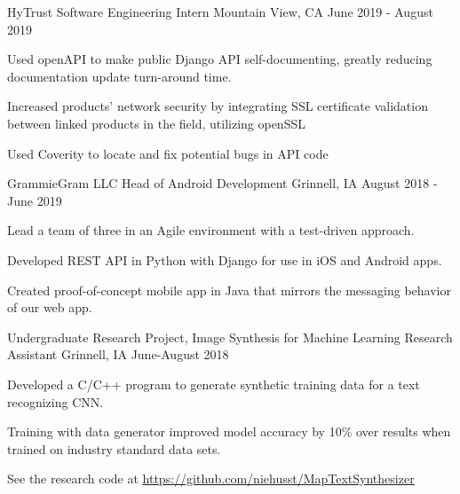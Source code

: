 \documentclass[12pt, a4paper]{awesome-cv}
\begin{document}
\begin{cventries}

  \cventry
    {HyTrust}
    {Software Engineering Intern}
    {Mountain View, CA}
    {June 2019 - August 2019}
    {
      \begin{cvitems}
	\item {Used openAPI to make public Django API self-documenting, greatly reducing documentation update turn-around time.}
	\item {Increased products' network security by integrating SSL certificate validation between linked products in the field, utilizing openSSL}
	\item {Used Coverity to locate and fix potential bugs in API code}
      \end{cvitems}
    }

  \cventry
    {GrammieGram LLC}
    {Head of Android Development}
    {Grinnell, IA}
    {August 2018 - June 2019}
    {
      \begin{cvitems}
        \item {Lead a team of three in an Agile environment with a test-driven approach.}
	\item {Developed REST API in Python with Django for use in iOS and Android apps.}
	\item {Created proof-of-concept mobile app in Java that mirrors the messaging behavior of our web app.}
      \end{cvitems}
    }


  \cventry
    {Undergraduate Research Project, Image Synthesis for Machine Learning}
    {Research Assistant}
    {Grinnell, IA}
    {June-August 2018}
    {
      \begin{cvitems}
        \item {Developed a C/C++ program to generate synthetic training data for a text recognizing CNN.}
        \item{Training with data generator improved model accuracy by 10\% over results when trained on industry standard data sets.}
	\item{See the research code at \underline{\href{https://github.com/niehusst/MapTextSynthesizer}{https://github.com/niehusst/MapTextSynthesizer}}}
      \end{cvitems}
    }



\end{cventries}
\end{document}
